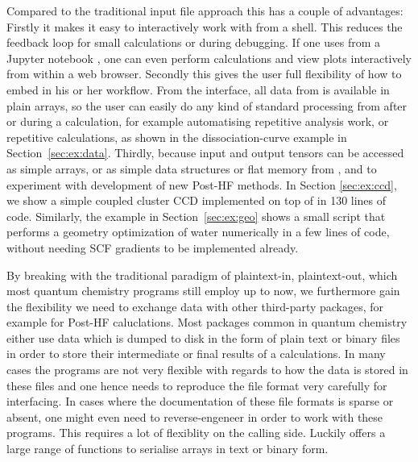 Compared to the traditional input file approach this has
a couple of advantages:
%
Firstly it makes it easy to interactively work with \molsturm
from a shell. This reduces the feedback loop for small calculations
or during debugging.  If one uses \molsturm from a Jupyter notebook \cite{Jupyter},
one can even perform calculations and view plots interactively from within a web browser.
%
Secondly this gives the user full flexibility
of how to embed \molsturm in his or her workflow.
From the \python interface, all data from \molsturm is available
in plain \numpy arrays, so the user can easily do
any kind of standard processing from \python
after or during a calculation, for example
automatising repetitive analysis work, or repetitive calculations,
as shown in the dissociation-curve example in Section~\ref{sec:ex:data}.
%
Thirdly, because input and output tensors can be accessed as simple
\numpy arrays, or as simple data structures or flat memory from \cpp,
and to experiment with development of new Post-HF methods.
In Section \ref{sec:ex:ccd}, we show a simple coupled cluster CCD
implemented on top of \molsturm in 130 lines of \numpy code.
Similarly, the example in Section~\ref{sec:ex:geo} shows a small
\python script that performs a geometry optimization of water 
numerically in a few lines of code, without needing SCF gradients 
to be implemented already.

By breaking with the traditional paradigm of plaintext-in, plaintext-out,
which most quantum chemistry programs still employ up to now,
we furthermore gain the flexibility we need to exchange data with
other third-party packages, for example for Post-HF caluclations.
Most packages common in quantum chemistry either use data which is
dumped to disk in the form of plain text or binary files
in order to store their intermediate or final results of
a calculations.
In many cases the programs are not very flexible with regards to
how the data is stored in these files and one hence needs to reproduce
the file format very carefully for interfacing.
In cases where the documentation of these file formats is sparse
or absent,
one might even need to reverse-engeneer in order to work with these programs.
This requires a lot of flexiblity on the calling side.
Luckily \python offers a large range of functions to serialise \numpy
arrays in text or binary form.

